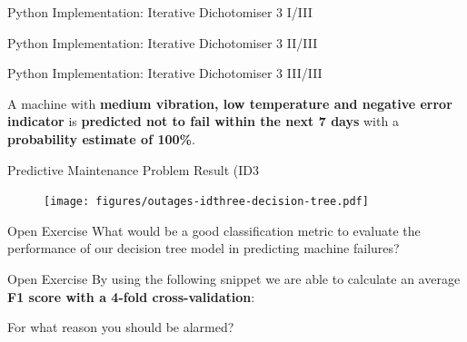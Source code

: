 \documentclass[document.tex]{subfiles}
\begin{document}
    \begin{frame}{Python Implementation: Iterative Dichotomiser 3 I/III}
        
    \end{frame}

    \begin{frame}{Python Implementation: Iterative Dichotomiser 3 II/III}
        
    \end{frame}

    \begin{frame}{Python Implementation: Iterative Dichotomiser 3 III/III}
        

        A machine with \textbf{medium vibration, low temperature and negative error indicator} is \textbf{predicted not to fail within the next 7 days} with a \textbf{probability estimate of 100\%}.
    \end{frame}

    \begin{frame}{Predictive Maintenance Problem Result (ID3}
        \begin{figure}
            \label{fig:outages-idthree-decision-tree}
            \texttt{[image: figures/outages-idthree-decision-tree.pdf]}
        \end{figure}
    \end{frame}

    \begin{frame}{Open Exercise }
        What would be a good classification metric to evaluate the performance of our decision tree model in predicting machine failures?
    \end{frame}

    \begin{frame}{Open Exercise }
        By using the following snippet we are able to calculate an average \textbf{F1 score with a 4-fold cross-validation}:

        

        For what reason you should be alarmed?
    \end{frame}
\end{document}
